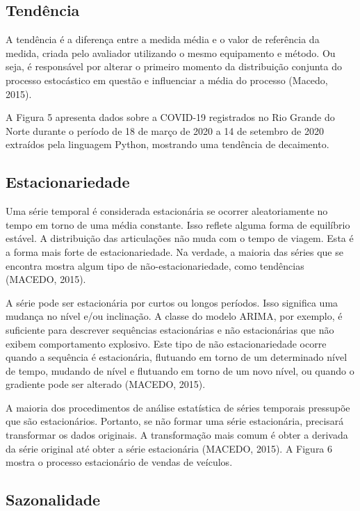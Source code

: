 \documentclass[
	12pt,				%
	openright,			%
	twoside,			%
	a4paper,			%
	english,			%
	french,				%
	spanish,			%
	brazil				%
	]{abntex2}
\begin{document}
\subsection{Tendência}

A tendência é a diferença entre a medida média e o valor de referência da medida, criada pelo avaliador utilizando o mesmo equipamento e método. Ou seja, é responsável por alterar o primeiro momento da distribuição conjunta do processo estocástico em questão e influenciar a média do processo (Macedo, 2015). 

A Figura 5 apresenta dados sobre a COVID-19 registrados no Rio Grande do Norte durante o período de 18 de março de 2020 a 14 de setembro de 2020 extraídos pela linguagem Python, mostrando uma tendência de decaimento.


\subsection{Estacionariedade}

Uma série temporal é considerada estacionária se ocorrer aleatoriamente no tempo em torno de uma média constante. Isso reflete alguma forma de equilíbrio estável. A distribuição das articulações não muda com o tempo de viagem. Esta é a forma mais forte de estacionariedade. Na verdade, a maioria das séries que se encontra mostra algum tipo de não-estacionariedade, como tendências (MACEDO, 2015).

A série pode ser estacionária por curtos ou longos períodos. Isso significa uma mudança no nível e/ou inclinação. A classe do modelo ARIMA, por exemplo, é suficiente para descrever sequências estacionárias e não estacionárias que não exibem comportamento explosivo. Este tipo de não estacionariedade ocorre quando a sequência é estacionária, flutuando em torno de um determinado nível de tempo, mudando de nível e flutuando em torno de um novo nível, ou quando o gradiente pode ser alterado (MACEDO, 2015).

A maioria dos procedimentos de análise estatística de séries temporais pressupõe que são estacionários. Portanto, se não formar uma série estacionária, precisará transformar os dados originais. A transformação mais comum é obter a derivada da série original até obter a série estacionária (MACEDO, 2015). A Figura 6 mostra o processo estacionário de vendas de veículos.

\subsection{Sazonalidade}
\end{document}
